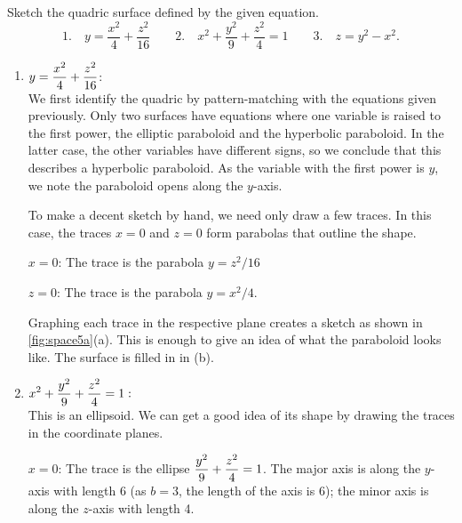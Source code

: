 \begin{example}\label{ex_space5}%
Sketch the quadric surface defined by the given equation.
\[
 \text{1.}\quad y=\frac{x^2}{4}+\frac{z^2}{16}\qquad
 \text{2.}\quad x^2+\frac{y^2}{9}+\frac{z^2}{4}=1\qquad
 \text{3.}\quad z=y^2-x^2.
\]
\solution
\begin{enumerate}
	\item $\displaystyle y=\frac{x^2}{4}+\frac{z^2}{16}$:\\
	We first identify the quadric by pattern-matching with the equations given previously. Only two surfaces have equations where one variable is raised to the first power, the elliptic paraboloid and the hyperbolic paraboloid. In the latter case, the other variables have different signs, so we conclude that this describes a hyperbolic paraboloid. As the variable with the first power is $y$, we note the paraboloid opens along the $y$-axis. 
	
	To make a decent sketch by hand, we need only draw a few traces. In this case, the traces $x=0$ and $z=0$ form parabolas that outline the shape.
	
	$x=0$:	The trace is the parabola $y=z^2/16$
	
	$z=0$: 	The trace is the parabola $y=x^2/4$.
	
	Graphing each trace in the respective plane creates a sketch as shown in \autoref{fig:space5a}(a). This is enough to give an idea of what the paraboloid looks like. The surface is filled in in (b).
	
	\item		$\displaystyle x^2+\frac{y^2}{9}+\frac{z^2}{4}=1:$\\
	This is an ellipsoid. We can get a good idea of its shape by drawing the traces in the coordinate planes.
	
	$x=0$: 	The trace is the ellipse $\displaystyle\frac{y^2}{9}+\frac{z^2}{4}=1$. The major axis is along the $y$-axis with length 6 (as $b=3$, the length of the axis is 6); the minor axis is along the $z$-axis with length 4.
	

\end{enumerate}
\end{example}

